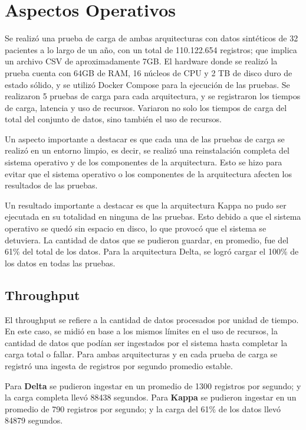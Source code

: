 \section{Aspectos Operativos}

Se realizó una prueba de carga de ambas arquitecturas con datos sintéticos de 32 pacientes a lo largo de un año, con un total de 110.122.654 registros; 
que implica un archivo CSV de aproximadamente 7GB.
El hardware donde se realizó la prueba cuenta con 64GB de RAM, 16 núcleos de CPU y 2 TB de disco duro de estado sólido, y se utilizó Docker Compose para la ejecución de las pruebas.
Se realizaron 5 pruebas de carga para cada arquitectura, y se registraron los tiempos de carga, latencia y uso de recursos.
Variaron no solo los tiempos de carga del total del conjunto de datos, sino también el uso de recursos.

Un aspecto importante a destacar es que cada una de las pruebas de carga se realizó en un entorno limpio, 
es decir, se realizó una reinstalación completa del sistema operativo y de los componentes de la arquitectura.
Esto se hizo para evitar que el sistema operativo o los componentes de la arquitectura afecten los resultados de las pruebas.

Un resultado importante a destacar es que la arquitectura Kappa no pudo ser ejecutada en su totalidad en ninguna de las pruebas. 
Esto debido a que el sistema operativo se quedó sin espacio en disco, lo que provocó que el sistema se detuviera.
La cantidad de datos que se pudieron guardar, en promedio, fue del 61\% del total de los datos.
Para la arquitectura Delta, se logró cargar el 100\% de los datos en todas las pruebas.

\subsection{Throughput}
El throughput se refiere a la cantidad de datos procesados por unidad de tiempo.
En este caso, se midió en base a los mismos límites en el uso de recursos, la cantidad de datos que podían ser ingestados por el sistema hasta completar la carga total o fallar.
Para ambas arquitecturas y en cada prueba de carga se registró una ingesta de registros por segundo promedio estable.
  

Para \textbf{Delta} se pudieron ingestar en un promedio de 1300 registros por segundo; y la carga completa llevó 88438 segundos.
Para \textbf{Kappa} se pudieron ingestar en un promedio de 790 registros por segundo; y la carga del 61\% de los datos llevó 84879 segundos.

